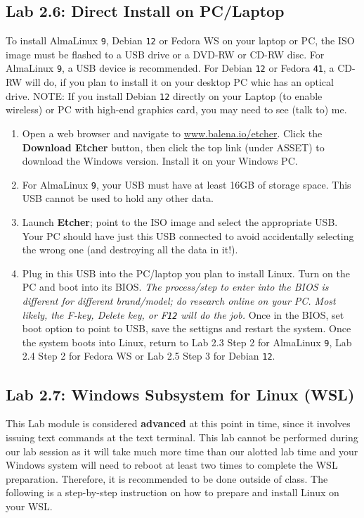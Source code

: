 \subsection*{Lab 2.6: Direct Install on PC/Laptop}

To install AlmaLinux {\tt{9}}, Debian {\tt{12}} or Fedora WS on your laptop or PC, the ISO image must be flashed to a USB drive or a DVD-RW or CD-RW disc. For AlmaLinux {\tt{9}}, a USB device is recommended. For Debian {\tt{12}} or Fedora {\tt{41}}, a CD-RW will do, if you plan to install it on your desktop PC whic has an optical drive. NOTE: If you install Debian {\tt{12}} directly on your Laptop (to enable wireless) or PC with high-end graphics card, you may need to see (talk to) me.    

\begin{enumerate}

   \item Open a web browser and navigate to {\url{www.balena.io/etcher}}. Click the {\bf{Download Etcher}} button, then click the top link (under ASSET) to download the Windows version. Install it on your Windows PC. 

   \item For AlmaLinux {\tt{9}}, your USB must have at least 16GB of storage space. This USB cannot be used to hold any other data.

   \item Launch {\bf{Etcher}}; point to the ISO image and select the appropriate USB. Your PC should have just this USB connected to avoid accidentally selecting the wrong one (and destroying all the data in it!). 

   \item Plug in this USB into the PC/laptop you plan to install Linux. Turn on the PC and boot into its BIOS. {\it{The process/step to enter into the BIOS is different for different brand/model; do research online on your PC. Most likely, the F-key, Delete key, or F{\tt{12}} will do the job.}} Once in the BIOS, set boot option to point to USB, save the settigns and restart the system. Once the system boots into Linux, return to Lab 2.3 Step 2 for AlmaLinux {\tt{9}}, Lab 2.4 Step 2 for Fedora WS or Lab 2.5 Step 3 for Debian {\tt{12}}.
\end{enumerate} 

\subsection*{Lab 2.7: Windows Subsystem for Linux (WSL)}
This Lab module is considered {\bf{advanced}} at this point in time, since it involves issuing text commands at the text terminal. This lab cannot be performed during our lab session as it will take much more time than our alotted lab time and your Windows system will need to reboot at least two times to complete the WSL preparation. Therefore, it is recommended to be done outside of class. The following is a step-by-step instruction on how to prepare and install Linux on your WSL.

